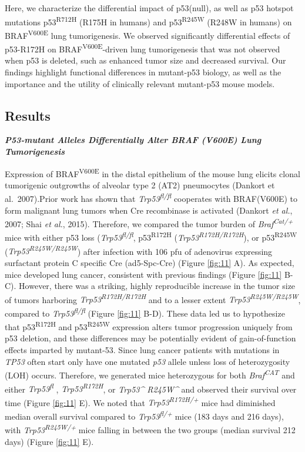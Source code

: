 Here, we characterize the differential impact of p53(null), as well as p53 hotspot mutations p53\textsuperscript{R712H} (R175H in humans) and p53\textsuperscript{R245W} (R248W in humans) on BRAF\textsuperscript{V600E} lung tumorigenesis. We observed significantly differential effects of p53-R172H on BRAF\textsuperscript{V600E}-driven lung tumorigenesis that was not observed when p53 is deleted, such as enhanced tumor size and decreased survival. Our findings highlight functional differences in mutant-p53 biology, as well as the importance and the utility of clinically relevant mutant-p53 mouse models.

\hypertarget{results-1}{%
\subsection{Results}\label{results-1}}

\emph{\textbf{P53-mutant Alleles Differentially Alter BRAF (V600E) Lung Tumorigenesis}}

Expression of BRAF\textsuperscript{V600E} in the distal epithelium of the mouse lung elicits clonal tumorigenic outgrowths of alveolar type 2 (AT2) pneumocytes (Dankort et al.~2007).Prior work has shown that \emph{Trp53\textsuperscript{fl/fl}} cooperates with BRAF(V600E) to form malignant lung tumors when Cre recombinase is activated (Dankort \emph{et al.}, 2007; Shai \emph{et al.}, 2015). Therefore, we compared the tumor burden of \emph{Braf\textsuperscript{Cat/+}} mice with either p53 loss (\emph{Trp53\textsuperscript{fl/fl}}, p53\textsuperscript{R172H} (\emph{Trp53\textsuperscript{R172H/R172H}}), or p53\textsuperscript{R245W} (\emph{Trp53\textsuperscript{R245W/R245W}}) after infection with 106 pfu of adenovirus expressing surfactant protein C specific Cre (ad5-Spc-Cre) (Figure \ref{fig:11} A). As expected, mice developed lung cancer, consistent with previous findings (Figure \ref{fig:11} B-C). However, there was a striking, highly reproducible increase in the tumor size of tumors harboring \emph{Trp53\textsuperscript{R172H/R172H}} and to a lesser extent \emph{Trp53\textsuperscript{R245W/R245W}}, compared to \emph{Trp53\textsuperscript{fl/fl}} (Figure \ref{fig:11} B-D). These data led us to hypothesize that p53\textsuperscript{R172H} and p53\textsuperscript{R245W} expression alters tumor progression uniquely from p53 deletion, and these differences may be potentially evident of gain-of-function effects imparted by mutant-53. Since lung cancer patients with mutations in \emph{TP53} often start only have one mutated \emph{p53} allele unless loss of heterozygosity (LOH) occurs. Therefore, we generated mice heterozygous for both \emph{Braf\textsuperscript{CAT}} and either \emph{Trp53\textsuperscript{fl}} , \emph{Trp53\textsuperscript{R172H}}, or \emph{Trp53\^{} R245W\^{}} and observed their survival over time (Figure \ref{fig:11} E). We noted that \emph{Trp53\textsuperscript{R172H/+}} mice had diminished median overall survival compared to \emph{Trp53\textsuperscript{fl/+}} mice (183 days and 216 days), with \emph{Trp53\textsuperscript{R245W/+}} mice falling in between the two groups (median survival 212 days) (Figure \ref{fig:11} E).

